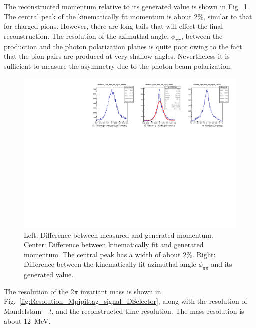 The reconstructed momentum relative to its generated value is shown in
Fig.~\ref{fig:DeltapDeltaPhi_signal_DSelector}. The central peak of the
kinematically fit momentum is about 2\%, similar to that for charged
pions. However, there are long tails that will effect the
final reconstruction. The resolution of the azimuthal angle,
$\phi_{\pi\pi}$, between the production and the photon polarization
planes is quite poor owing to the fact that the pion pairs are
produced at very shallow angles. Nevertheless it is sufficient to
measure the asymmetry due to the photon beam polarization.
\begin{figure}[tph]
\centering
\includegraphics[width=6in]{figures/DeltapDeltaPhi_signal_DSelector.pdf}
\caption{Left: Difference between measured and generated momentum. Center: Difference between kinematically fit and generated momentum. The central peak has a width of about 2\%. Right: Difference between the kinematically fit azimuthal angle $\phi_{\pi\pi}$ and its generated value.
\label{fig:DeltapDeltaPhi_signal_DSelector}}
\end{figure}
The resolution of the 2$\pi$ invariant mass is shown in Fig.~\ref{fig:Resolution_Mpipittag_signal_DSelector}, along with the resolution of Mandelstam $-t$, and the reconstructed time resolution. The mass resolution is about 12~MeV.
